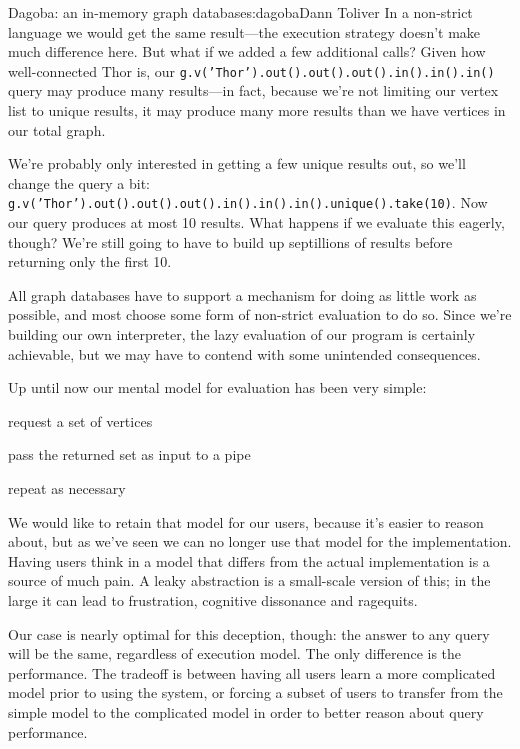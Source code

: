 \begin{aosachapter}{Dagoba: an in-memory graph database}{s:dagoba}{Dann Toliver}
In a non-strict language we would get the same result---the execution
strategy doesn't make much difference here. But what if we added a few
additional calls? Given how well-connected Thor is, our
\texttt{g.v('Thor').out().out().out().in().in().in()} query may produce
many results---in fact, because we're not limiting our vertex list to
unique results, it may produce many more results than we have vertices
in our total graph.

We're probably only interested in getting a few unique results out, so
we'll change the query a bit:
\texttt{g.v('Thor').out().out().out().in().in().in().unique().take(10)}.
Now our query produces at most 10 results. What happens if we evaluate
this eagerly, though? We're still going to have to build up septillions
of results before returning only the first 10.

All graph databases have to support a mechanism for doing as little work
as possible, and most choose some form of non-strict evaluation to do
so. Since we're building our own interpreter, the lazy evaluation of our
program is certainly achievable, but we may have to contend with some
unintended consequences.

\label{ramifications-of-evaluation-strategy-on-our-mental-model}

Up until now our mental model for evaluation has been very simple:

\begin{aosaitemize}

\item
  request a set of vertices
\item
  pass the returned set as input to a pipe
\item
  repeat as necessary
\end{aosaitemize}

We would like to retain that model for our users, because it's easier to
reason about, but as we've seen we can no longer use that model for the
implementation. Having users think in a model that differs from the
actual implementation is a source of much pain. A leaky abstraction is a
small-scale version of this; in the large it can lead to frustration,
cognitive dissonance and ragequits.

Our case is nearly optimal for this deception, though: the answer to any
query will be the same, regardless of execution model. The only
difference is the performance. The tradeoff is between having all users
learn a more complicated model prior to using the system, or forcing a
subset of users to transfer from the simple model to the complicated
model in order to better reason about query performance.


\end{aosachapter}
